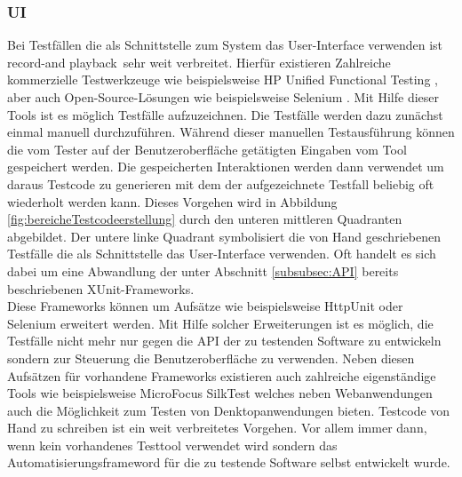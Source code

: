 \subsubsection{UI}
\label{subsubsec:UI}
Bei Testfällen die als Schnittstelle zum System das User-Interface verwenden ist \grq record-and playback\grq\ sehr weit verbreitet. Hierfür existieren Zahlreiche kommerzielle Testwerkzeuge wie beispielsweise HP Unified Functional Testing \cite{hp_testautomatisierung_2015}, aber auch Open-Source-Lösungen wie beispielsweise Selenium \cite{selenium_selenium_2015}.
Mit Hilfe dieser Tools ist es möglich Testfälle aufzuzeichnen. Die Testfälle werden dazu zunächst einmal manuell durchzuführen. Während dieser manuellen Testausführung können die vom Tester auf der Benutzeroberfläche getätigten Eingaben vom Tool gespeichert werden. Die gespeicherten Interaktionen werden dann verwendet um daraus Testcode zu generieren mit dem der aufgezeichnete Testfall beliebig oft wiederholt werden kann. Dieses Vorgehen wird in Abbildung \ref{fig:bereicheTestcodeerstellung} durch den unteren mittleren Quadranten abgebildet.
Der untere linke Quadrant symbolisiert die von Hand geschriebenen Testfälle die als Schnittstelle das User-Interface verwenden. Oft handelt es sich dabei um eine Abwandlung der unter Abschnitt \ref{subsubsec:API} bereits beschriebenen \grq XUnit-Frameworks\grq.\\ Diese Frameworks können um Aufsätze wie beispielsweise HttpUnit \cite{httpunit_httpunit_2015} oder Selenium \cite{selenium_selenium_2015} erweitert werden. Mit Hilfe solcher Erweiterungen ist es möglich, die Testfälle nicht mehr nur gegen die API der zu testenden Software zu entwickeln sondern zur Steuerung die Benutzeroberfläche zu verwenden. Neben diesen Aufsätzen für vorhandene Frameworks existieren auch zahlreiche eigenständige Tools wie beispielsweise MicroFocus SilkTest \cite{silk_test_borland_2015} welches neben Webanwendungen auch die Möglichkeit zum Testen von Denktopanwendungen bieten.
Testcode von Hand zu schreiben ist ein weit verbreitetes Vorgehen. Vor allem immer dann, wenn kein vorhandenes Testtool verwendet wird sondern das Automatisierungsframeword für die zu testende Software selbst entwickelt wurde.


